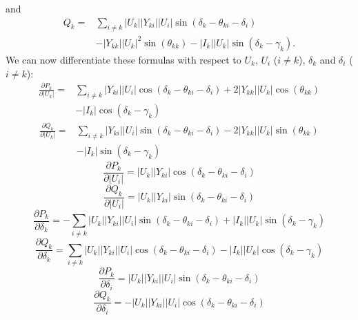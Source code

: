 and
\begin{equation}
	\begin{split}
		Q_k = 	& \sum_{i \ne k} |U_k| |Y_{ki}| |U_i| \sin \left( \delta_k - \theta_{ki} - \delta_i \right) \\
				& - |Y_{kk}| |U_k|^2 \sin \left( \theta_{kk} \right) - |I_k| |U_k| \sin \left( \delta_k - \gamma_k \right).
	\end{split}
\end{equation}
We can now differentiate these formulas with respect to $U_k$, $U_i$ ($i \ne k$), $\delta_k$ and $\delta_i$ ($i \ne k$):
\begin{equation}
	\begin{split}
		\frac{\partial P_k}{\partial |U_k|} = 
			& \sum_{i \ne k} |Y_{ki}| |U_i| \cos \left( \delta_k - \theta_{ki} - \delta_i \right) + 2 |Y_{kk}| |U_k| \cos \left( \theta_{kk} \right) \\
			& - |I_k| \cos \left( \delta_k - \gamma_k \right)
	\end{split}
	\label{eq:pk_magnitudek}
\end{equation}
\begin{equation}
	\begin{split}
		\frac{\partial Q_k}{\partial |U_k|} = 
			& \sum_{i \ne k} |Y_{ki}| |U_i| \sin \left( \delta_k - \theta_{ki} - \delta_i \right) - 2 |Y_{kk}| |U_k| \sin \left( \theta_{kk} \right) \\
			& - |I_k| \sin \left( \delta_k - \gamma_k \right)
	\end{split}
	\label{eq:qk_magnitudek}
\end{equation}
\begin{equation}
	\frac{\partial P_k}{\partial |U_i|} = |U_k| |Y_{ki}| \cos \left( \delta_k - \theta_{ki} - \delta_i \right)
	\label{eq:pk_magnitudei}
\end{equation}
\begin{equation}
	\frac{\partial Q_k}{\partial |U_i|} = |U_k| |Y_{ki}| \sin \left( \delta_k - \theta_{ki} - \delta_i \right)
	\label{eq:qk_magnitudei}
\end{equation}
\begin{equation}
	\frac{\partial P_k}{\partial \delta_k} = - \sum_{i \ne k} |U_k| |Y_{ki}| |U_i| \sin \left( \delta_k - \theta_{ki} - \delta_i \right) + |I_k| |U_k| \sin \left( \delta_k - \gamma_k \right)
	\label{eq:pk_phasek}
\end{equation}
\begin{equation}
	\frac{\partial Q_k}{\partial \delta_k} = \sum_{i \ne k} |U_k| |Y_{ki}| |U_i| \cos \left( \delta_k - \theta_{ki} - \delta_i \right) - |I_k| |U_k| \cos \left( \delta_k - \gamma_k \right)
	\label{eq:qk_phasek}
\end{equation}
\begin{equation}
	\frac{\partial P_k}{\partial \delta_i} = |U_k| |Y_{ki}| |U_i| \sin \left( \delta_k - \theta_{ki} - \delta_i \right)
	\label{eq:pk_phasei}
\end{equation}
\begin{equation}
	\frac{\partial Q_k}{\partial \delta_i} = - |U_k| |Y_{ki}| |U_i| \cos \left( \delta_k - \theta_{ki} - \delta_i \right)
	\label{eq:qk_phasei}
\end{equation}

